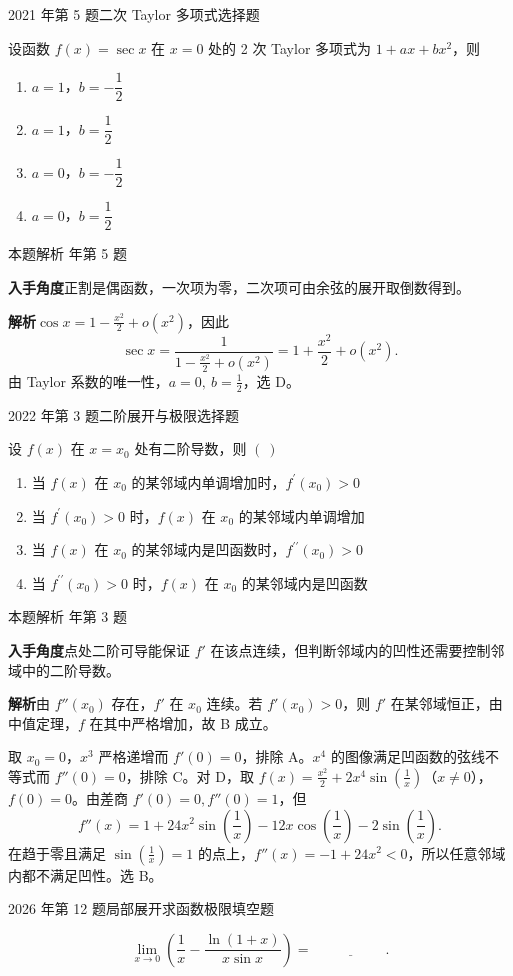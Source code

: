\documentclass[UTF8,zihao=-4,fontset=fandol]{ctexart}
\renewcommand{\lim}{\operatorname*{lim}\limits}
\newcommand{\blank}{\underline{\hspace{5em}}}
\newenvironment{abcd}{\begin{enumerate}[label=\textup{(\Alph*)},leftmargin=2.3em,itemsep=1pt,topsep=4pt,parsep=1pt]}{\end{enumerate}}
\newcommand{\choices}[4]{%
  \begin{abcd}
    \item #1
    \item #2
    \item #3
    \item #4
  \end{abcd}}
\newcommand{\QuestionPage}[6]{%
  \par\noindent\begin{minipage}{\linewidth}
  \raggedright
  {\small\textcolor{black!60}{#3\quad #5}\hfill\textcolor{accent}{#2}}\par\smallskip}
\newcommand{\QuestionEnd}{\end{minipage}\par\medskip}
\newcommand{\QuestionPage}[6]{%
  \clearpage
  {\small\textcolor{accent}{#1\hfill #2}}\par\medskip
  {\small\textcolor{black!60}{#3\quad #5\hfill #6}}\par\vspace{9bp}}
\newcommand{\QuestionEnd}{}
\newenvironment{QuestionSolution}[1]{%
  \clearpage
  {\small\textcolor{black!60}{本题解析\quad #1}}\par\medskip
}{\par\clearpage}
\begin{document}
\QuestionPage{2.5 Taylor定理及其应用}{选择题}{2021 年第 5 题}{1}{二次 Taylor 多项式}{098 / 234}
设函数 \(f(x)=\sec x\) 在 \(x=0\) 处的 2 次 Taylor 多项式为 \(1+ax+bx^2\)，则
\choices{\(a=1\)，\(b=-\dfrac{1}{2}\)}{\(a=1\)，\(b=\dfrac{1}{2}\)}{\(a=0\)，\(b=-\dfrac{1}{2}\)}{\(a=0\)，\(b=\dfrac{1}{2}\)}
\QuestionEnd

\begin{QuestionSolution}{2021 年第 5 题}
\textbf{入手角度}\quad 正割是偶函数，一次项为零，二次项可由余弦的展开取倒数得到。

\textbf{解析}\quad \(\cos x=1-\frac{x^2}{2}+o(x^2)\)，因此
\[
\sec x=\frac1{1-\frac{x^2}{2}+o(x^2)}
=1+\frac{x^2}2+o(x^2).
\]
由 Taylor 系数的唯一性，\(\boxed{a=0,\ b=\frac{1}{2}}\)，选 D。
\end{QuestionSolution}

\QuestionPage{2.5 Taylor定理及其应用}{选择题}{2022 年第 3 题}{1}{二阶展开与极限}{099 / 234}
设 \(f\left( x \right)\) 在 \(x = x_{0}\) 处有二阶导数，则 \(\left( \ \right)\)
\choices{当 \(f\left( x \right)\) 在 \(x_{0}\) 的某邻域内单调增加时，\(f^{\prime}\left( x_{0} \right) > 0\)}{当 \(f^{\prime}\left( x_{0} \right) > 0\) 时，\(f\left( x \right)\) 在 \(x_{0}\) 的某邻域内单调增加}{当 \(f\left( x \right)\) 在 \(x_{0}\) 的某邻域内是凹函数时，\(f^{\prime\prime}\left( x_{0} \right) > 0\)}{当 \(f^{\prime\prime}\left( x_{0} \right) > 0\) 时，\(f\left( x \right)\) 在 \(x_{0}\) 的某邻域内是凹函数}
\QuestionEnd

\begin{QuestionSolution}{2022 年第 3 题}
\textbf{入手角度}\quad 点处二阶可导能保证 \(f'\) 在该点连续，但判断邻域内的凹性还需要控制邻域中的二阶导数。

\textbf{解析}\quad 由 \(f''(x_0)\) 存在，\(f'\) 在 \(x_0\) 连续。若 \(f'(x_0)>0\)，则 \(f'\) 在某邻域恒正，由中值定理，\(f\) 在其中严格增加，故 B 成立。

取 \(x_0=0\)，\(x^3\) 严格递增而 \(f'(0)=0\)，排除 A。\(x^4\) 的图像满足凹函数的弦线不等式而 \(f''(0)=0\)，排除 C。对 D，取 \(f(x)=\frac{x^2}{2}+2x^4\sin(\frac{1}{x})\)（\(x\ne0\)），\(f(0)=0\)。由差商 \(f'(0)=0,f''(0)=1\)，但
\[
f''(x)=1+24x^2\sin(\frac{1}{x})-12x\cos(\frac{1}{x})-2\sin(\frac{1}{x}).
\]
在趋于零且满足 \(\sin(\frac{1}{x})=1\) 的点上，\(f''(x)=-1+24x^2<0\)，所以任意邻域内都不满足凹性。选 B。
\end{QuestionSolution}

\QuestionPage{2.5 Taylor定理及其应用}{填空题}{2026 年第 12 题}{2}{局部展开求函数极限}{100 / 234}
\[\lim_{x\to 0}\left(\frac1x-\frac{\ln(1+x)}{x\sin x}\right)=\ \blank{}.
\]
\QuestionEnd
\end{document}
